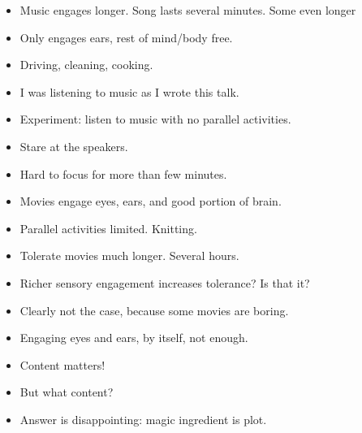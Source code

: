 \documentclass[12pt]{article}
\begin{document}
{\begin{itemize}
\item Music engages longer.  Song lasts several minutes.  Some even longer
\end{itemize}

\begin{itemize}

\item Only engages ears, rest of mind/body free.

\item Driving, cleaning, cooking.

\item I was listening to music as I wrote this talk.

\item Experiment:  listen to music with no parallel activities.

\item Stare at the speakers.

\item Hard to focus for more than few minutes.
\end{itemize}

\begin{itemize}

\item Movies engage eyes, ears, and good portion of brain.

\item Parallel activities limited.  Knitting.

\item Tolerate movies much longer.  Several hours.

\item Richer sensory engagement increases tolerance?  Is that it?
\end{itemize}

\begin{itemize}

\item Clearly not the case, because some movies are boring.

\item Engaging eyes and ears, by itself, not enough.

\item Content matters!

\item But what content?

\item Answer is disappointing:  magic ingredient is plot.
\end{itemize}

}
\end{document}
